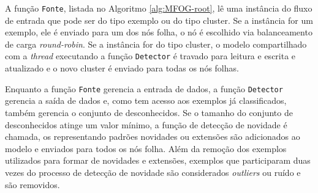 A função \texttt{Fonte}, listada no Algoritmo \ref{alg:MFOG-root}, lê uma
instância do fluxo de entrada que pode ser do tipo exemplo ou do tipo cluster.
Se a instância for um exemplo, ele é enviado para um dos nós folha, o nó é
escolhido via balanceamento de carga \emph{round-robin}.
Se a instância for do tipo cluster, o modelo compartilhado com a \emph{thread}
executando a função \texttt{Detector} é travado para leitura e escrita e
atualizado e o novo cluster é enviado para todas os nós folhas.

Enquanto a função \texttt{Fonte} gerencia a entrada de dados, a função
\texttt{Detector} gerencia a saída de dados e, como tem acesso aos exemplos já
classificados, também gerencia o conjunto de desconhecidos.
Se o tamanho do conjunto de desconhecidos atinge um valor mínimo, a função de
detecção de novidade é chamada, os \mclusters representando padrões novidades ou
extensões são adicionados ao modelo e enviados para todos os nós folha.
Além da remoção dos exemplos utilizados para formar \mclusters de novidades e
extensões, exemplos que participaram duas vezes do processo de detecção de
novidade são considerados \emph{outliers} ou ruído e são removidos.


